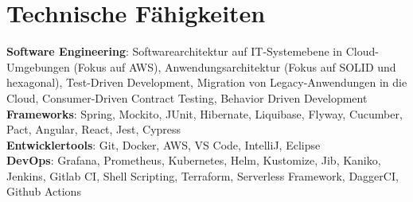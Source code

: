 \documentclass[a4paper,12pt]{article}
\begin{document}
\section{Technische Fähigkeiten}
\begin{itemize}[leftmargin=0.15in, label={}]
	\small{
		\item{
			\textbf{Software Engineering}{: Softwarearchitektur auf IT-Systemebene in Cloud-Umgebungen (Fokus auf AWS),
				Anwendungsarchitektur (Fokus auf SOLID und hexagonal), Test-Driven Development, Migration von
				Legacy-Anwendungen in die Cloud, Consumer-Driven Contract Testing, Behavior Driven Development} \\
			\textbf{Frameworks}{: Spring, Mockito, JUnit, Hibernate, Liquibase, Flyway, Cucumber, Pact, Angular, React, Jest, Cypress} \\
			\textbf{Entwicklertools}{: Git, Docker, AWS, VS Code, IntelliJ, Eclipse} \\
			\textbf{DevOps}{: Grafana, Prometheus, Kubernetes, Helm, Kustomize, Jib, Kaniko, Jenkins, Gitlab CI, Shell Scripting, Terraform, Serverless Framework, DaggerCI, Github Actions}
	}}
\end{itemize}
\end{document}
